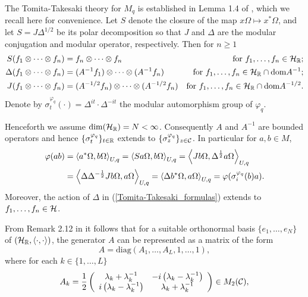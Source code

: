 The Tomita-Takesaki theory for $M_q$ is established in Lemma 1.4 of \cite{Hia03}, which we recall here for convenience. Let $S$ denote the closure of the map $x\Omega\mapsto x^*\Omega$, and let $S=J\Delta^{1/2}$ be its polar decomposition so that $J$ and $\Delta$ are the modular conjugation and modular operator, respectively. Then for $n\geq 1$
	\begin{align}\label{Tomita-Takesaki_formulas}
		S(f_1\otimes\cdots\otimes f_n)&=f_n\otimes \cdots \otimes f_n	&\text{for }f_1,\ldots, f_n\in\mathcal H_{\mathbb{R}};\notag\\
		\Delta(f_1\otimes\cdots\otimes f_n)&=(A^{-1}f_1)\otimes \cdots\otimes (A^{-1} f_n)		&\text{for }f_1,\ldots,f_n\in \mathcal H_{\mathbb{R}}\cap \text{dom}{A^{-1}};\\
		J(f_1\otimes\cdots\otimes f_n)&=(A^{-1/2} f_n)\otimes\cdots \otimes (A^{-1/2}f_n)		&\text{for }f_1,\ldots, f_n\in \mathcal H_{\mathbb{R}}\cap\text{dom}{A^{-1/2}}.\notag
	\end{align}
Denote by $\sigma_t^{\varphi_q}(\cdot)= \Delta^{it} \cdot \Delta^{-it}$ the modular automorphism group of $\varphi_q$.\par
Henceforth we assume $\dim(\mathcal H_{\mathbb{R}})=N<\infty$. Consequently $A$ and $A^{-1}$ are bounded operators and hence $\{\sigma_t^{\varphi_q}\}_{t\in\mathbb{R}}$ extends to $\{\sigma_z^{\varphi_q}\}_{z\in\mathcal C}$. In particular for $a,b\in M$,
	\begin{align*}
		\varphi(ab)&=\left\langle a^*\Omega, b\Omega\right\rangle_{U,q}=\left\langle S a\Omega, b\Omega\right\rangle_{U,q}=\left\langle Jb\Omega, \Delta^\frac{1}{2} a\Omega\right\rangle_{U,q}\\
				&=\left\langle \Delta \Delta^{-\frac{1}{2}} Jb\Omega,a\Omega\right\rangle_{U,q} = \left\langle \Delta b^*\Omega, a\Omega\right\rangle_{U,q}= \varphi(\sigma_{i}^{\varphi_q}(b) a).
	\end{align*}
Moreover, the action of $\Delta$ in (\ref{Tomita-Takesaki_formulas}) extends to $f_1,\ldots, f_n\in \mathcal H$.\par
From Remark 2.12 in \cite{Shl97} it follows that for a suitable orthonormal basis $\{e_1,\ldots,e_N\}$ of $(\mathcal H_{\mathbb{R}},\left\langle\cdot,\cdot\right\rangle)$, the generator $A$ can be represented as a matrix of the form
	\begin{equation}\label{matrix_form_A}
		A=\text{diag}\left( A_1,\ldots, A_L,1,\ldots,1\right),
	\end{equation}
where for each $k\in\{1,\ldots,L\}$
	\begin{equation}\label{matrix_form_A_2}
		A_k=\frac{1}{2}\left(\begin{array}{cc}
						\lambda_k+\lambda_k^{-1}		& -i\left(\lambda_k-\lambda_k^{-1}\right)	\\
						i\left(\lambda_k-\lambda_k^{-1}\right)	& \lambda_k+\lambda_k^{-1}	\end{array}\right)\in M_2(\mathcal C),
	\end{equation}
